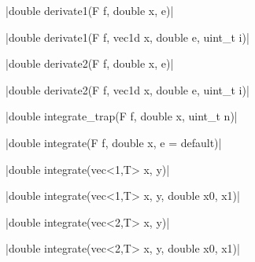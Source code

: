\item \cppinline|double derivate1(F f, double x, e)| 

\cppinline|double derivate1(F f, vec1d x, double e, uint_t i)| 

\item \cppinline|double derivate2(F f, double x, e)| 

\cppinline|double derivate2(F f, vec1d x, double e, uint_t i)| 

\item \cppinline|double integrate_trap(F f, double x, uint_t n)| 

\cppinline|double integrate(F f, double x, e = default)| 

\item \cppinline|double integrate(vec<1,T> x, y)| 

\cppinline|double integrate(vec<1,T> x, y, double x0, x1)|

\cppinline|double integrate(vec<2,T> x, y)|

\cppinline|double integrate(vec<2,T> x, y, double x0, x1)|
